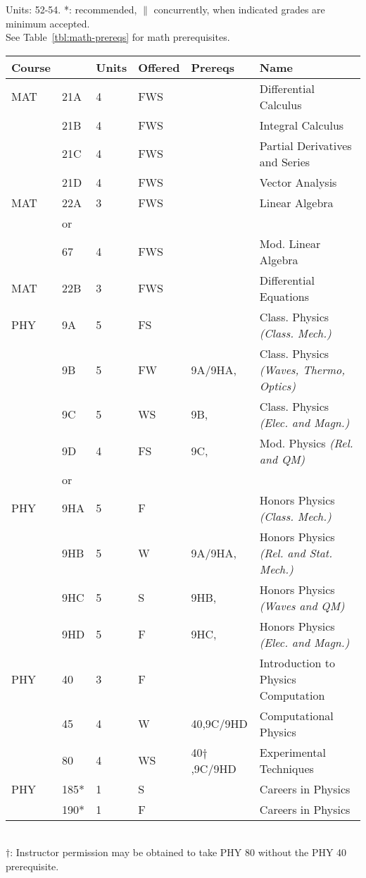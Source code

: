 \documentclass[12pt]{article}
\begin{document}
\vskip 2cm
\vskip 0.25cm
\noindent
Units:  52-54. *: recommended, $\parallel$ concurrently, when indicated grades are minimum accepted.\\
See Table~\ref{tbl:math-prereqs} for math prerequisites.\\
\begin{tabular}{|llllll|}
\hline
Course & & Units & Offered & Prereqs & Name \\
\hline
MAT & 21A & 4 & FWS & & Differential Calculus\\ 
    & 21B & 4 & FWS &  & Integral Calculus \\ 
    & 21C & 4 & FWS &  & Partial Derivatives and Series\\ 
    & 21D & 4 & FWS &  & Vector Analysis\\
\hline
MAT & 22A & 3 & FWS &  & Linear Algebra\\
    & or  & & & & \\
    & 67  & 4 & FWS &  & Mod. Linear Algebra\\
\hline
MAT & 22B & 3 & FWS &  & Differential Equations\\ 
\hline
\hline

PHY & 9A & 5 & FS &  & Class. Physics {\it (Class. Mech.)}\\
& 9B & 5 & FW & 9A/9HA,    & Class. Physics {\it (Waves, Thermo, Optics)}\\
    & 9C & 5 & WS & 9B,  & Class. Physics {\it (Elec. and Magn.)}\\ 
    & 9D & 4 & FS & 9C, & Mod. Physics {\it (Rel. and QM)}\\ 
\hline
&or&&\\
\hline
PHY & 9HA & 5 & F &  & Honors Physics {\it (Class. Mech.)}\\ 
    & 9HB & 5 & W & 9A/9HA,  & Honors Physics {\it (Rel. and Stat. Mech.)}\\ 
    & 9HC & 5 & S & 9HB,  & Honors Physics {\it (Waves and QM)}\\ 
    & 9HD & 5 & F & 9HC,   & Honors Physics {\it (Elec. and Magn.)}\\ 
\hline
\hline
PHY & 40  & 3 & F & & Introduction to Physics Computation \\ 
    & 45  & 4 & W & 40,9C/9HD & Computational Physics\\ 
    & 80  & 4 & WS & 40$\dagger$,9C/9HD     & Experimental Techniques \\
PHY & 185* & 1 & S & & Careers in Physics \\ 
    & 190* & 1 & F & & Careers in Physics \\ 
\hline
\end{tabular}\\
$\dagger$:  Instructor permission may be obtained to take PHY 80 without the PHY 40 prerequisite.\\
\end{document}
